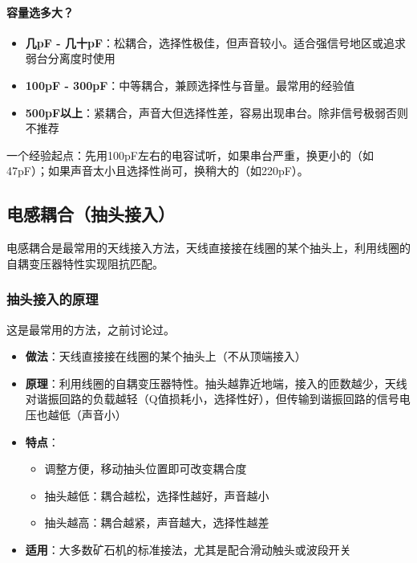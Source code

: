 \documentclass[12pt,UTF8]{ctexbook}
\begin{document}
\paragraph{容量选多大？}

\begin{itemize}[leftmargin=3.5em]
	\item \textbf{几pF - 几十pF}：松耦合，选择性极佳，但声音较小。适合强信号地区或追求弱台分离度时使用
	\item \textbf{100pF - 300pF}：中等耦合，兼顾选择性与音量。最常用的经验值
	\item \textbf{500pF以上}：紧耦合，声音大但选择性差，容易出现串台。除非信号极弱否则不推荐
\end{itemize}

一个经验起点：先用100pF左右的电容试听，如果串台严重，换更小的（如47pF）；如果声音太小且选择性尚可，换稍大的（如220pF）。

\subsection{电感耦合（抽头接入）}

电感耦合是最常用的天线接入方法，天线直接接在线圈的某个抽头上，利用线圈的自耦变压器特性实现阻抗匹配。

\subsubsection{抽头接入的原理}

这是最常用的方法，之前讨论过。
\begin{itemize}[leftmargin=3.5em]
	\item \textbf{做法}：天线直接接在线圈的某个抽头上（不从顶端接入）
	\item \textbf{原理}：利用线圈的自耦变压器特性。抽头越靠近地端，接入的匝数越少，天线对谐振回路的负载越轻（Q值损耗小，选择性好），但传输到谐振回路的信号电压也越低（声音小）
	\item \textbf{特点}：
	\begin{itemize}[leftmargin=3.5em]
		\item 调整方便，移动抽头位置即可改变耦合度
		\item 抽头越低：耦合越松，选择性越好，声音越小
		\item 抽头越高：耦合越紧，声音越大，选择性越差
	\end{itemize}
	\item \textbf{适用}：大多数矿石机的标准接法，尤其是配合滑动触头或波段开关
\end{itemize}
\end{document}
